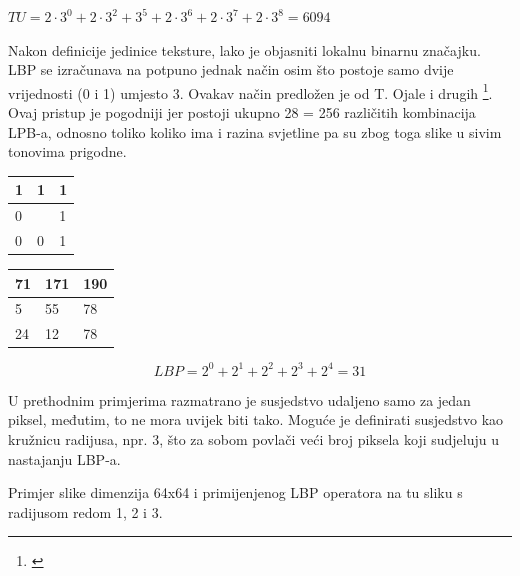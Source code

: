 \documentclass[times, utf8, zavrsni]{fer}
\begin{document}
\begin{center}
\(TU = 2 \cdot 3^0 + 2 \cdot 3^2 + 3^5 + 2 \cdot 3^6 + 2 \cdot 3^7 + 2 \cdot 3^8 = 6094\)
\end{center}

Nakon definicije jedinice teksture, lako je objasniti lokalnu binarnu značajku. 
LBP se izračunava na potpuno jednak način osim što postoje samo dvije vrijednosti 
(0 i 1) umjesto 3. Ovakav način predložen je od T. Ojale i drugih \footnote{\cite{ojala}}. Ovaj 
pristup je pogodniji jer postoji ukupno 28  = 256 različitih kombinacija LPB-a, 
odnosno toliko koliko ima i razina svjetline pa su zbog toga slike u sivim 
tonovima prigodne.


\begin{multicols}{2}

\begin{minipage}{\linewidth}
\centering
\begin{tabularx}{0.4\textwidth}{| X | X | X |}
\hline
1 & 1 & 1 \\ 
\hline
0 &  & 1 \\ 
\hline
0 & 0 & 1 \\
\hline
\end{tabularx}
\end{minipage}

\begin{minipage}{\linewidth}
\centering
\begin{tabularx}{0.4\textwidth}{| X | X | X |}
\hline
71 & 171 & 190 \\ 
\hline
5 & 55 & 78 \\ 
\hline
24 & 12 & 78 \\
\hline
\end{tabularx}
\end{minipage}

\end{multicols}

\[LBP = 2^0 + 2^1 + 2^2 + 2^3 + 2^4 = 31\]

U prethodnim primjerima razmatrano je susjedstvo udaljeno samo za 
jedan piksel, međutim, to ne mora uvijek biti tako. Moguće je 
definirati susjedstvo kao kružnicu radijusa, npr. 3, što za sobom 
povlači veći broj piksela koji sudjeluju u nastajanju LBP-a. 

\bigbreak

Primjer slike dimenzija 64x64 i primijenjenog LBP operatora na tu 
sliku s radijusom redom 1, 2 i 3.
\end{document}

